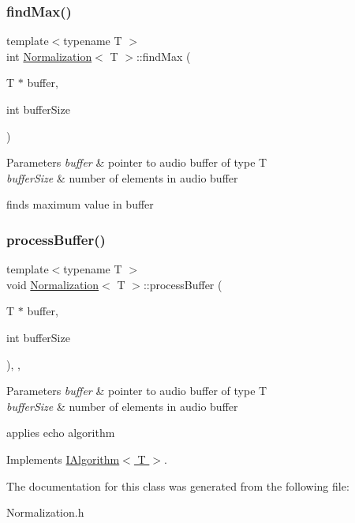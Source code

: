 \subsubsection{\texorpdfstring{find\+Max()}{findMax()}}
{\footnotesize\ttfamily template$<$typename T $>$ \\
int \hyperlink{classNormalization}{Normalization}$<$ T $>$\+::find\+Max (\begin{DoxyParamCaption}\item[{T $\ast$}]{buffer,  }\item[{int}]{buffer\+Size }\end{DoxyParamCaption})\hspace{0.3cm}{\ttfamily [inline]}}


\begin{DoxyParams}{Parameters}
{\em buffer} & pointer to audio buffer of type T \\
\hline
{\em buffer\+Size} & number of elements in audio buffer\\
\hline
\end{DoxyParams}
finds maximum value in buffer \mbox{\label{classNormalization_a0f441de817c3dbb8348cb9dfd66879d7}} 
\subsubsection{\texorpdfstring{process\+Buffer()}{processBuffer()}}
{\footnotesize\ttfamily template$<$typename T $>$ \\
void \hyperlink{classNormalization}{Normalization}$<$ T $>$\+::process\+Buffer (\begin{DoxyParamCaption}\item[{T $\ast$}]{buffer,  }\item[{int}]{buffer\+Size }\end{DoxyParamCaption})\hspace{0.3cm}{\ttfamily [inline]}, {\ttfamily [override]}, {\ttfamily [virtual]}}


\begin{DoxyParams}{Parameters}
{\em buffer} & pointer to audio buffer of type T \\
\hline
{\em buffer\+Size} & number of elements in audio buffer\\
\hline
\end{DoxyParams}
applies echo algorithm 

Implements \hyperlink{classIAlgorithm}{I\+Algorithm$<$ T $>$}.



The documentation for this class was generated from the following file\+:\begin{DoxyCompactItemize}
\item 
Normalization.\+h\end{DoxyCompactItemize}
